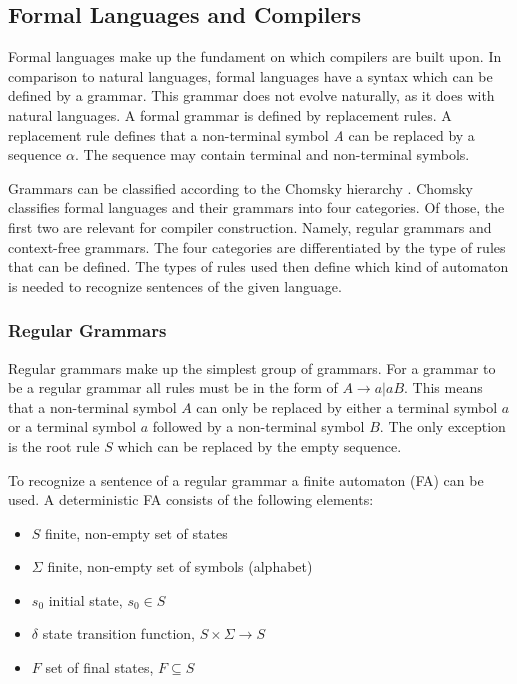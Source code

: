 \subsection{Formal Languages and Compilers}

Formal languages make up the fundament on which compilers are built upon. In comparison to natural languages, formal languages have a syntax which can be defined by a grammar. This grammar does not evolve naturally, as it does with natural languages. A formal grammar is defined by replacement rules. A replacement rule defines that a non-terminal symbol \textit{A} can be replaced by a sequence $\alpha$. The sequence may contain terminal and non-terminal symbols. 

Grammars can be classified according to the Chomsky hierarchy \parencite{CHOMSKY1959137}. Chomsky classifies formal languages and their grammars into four categories. Of those, the first two are relevant for compiler construction. Namely, regular grammars and context-free grammars. The four categories are differentiated by the type of rules that can be defined. The types of rules used then define which kind of automaton is needed to recognize sentences of the given language. 

\subsubsection{Regular Grammars}

Regular grammars make up the simplest group of grammars. For a grammar to be a regular grammar all rules must be in the form of $A\rightarrow a | a B$. This means that a non-terminal symbol $A$ can only be replaced by either a terminal symbol $a$ or a terminal symbol $a$ followed by a non-terminal symbol $B$. The only exception is the root rule $S$ which can be replaced by the empty sequence. 

To recognize a sentence of a regular grammar a finite automaton (FA) can be used. A deterministic FA consists of the following elements:

\begin{itemize}
    \item $S$ finite, non-empty set of states
    \item $\Sigma$ finite, non-empty set of symbols (alphabet)
    \item $s_0$ initial state, $s_0 \in S$
    \item $\delta$ state transition function, $S \times \Sigma \rightarrow S$
    \item $F$ set of final states, $F \subseteq S$
\end{itemize}

